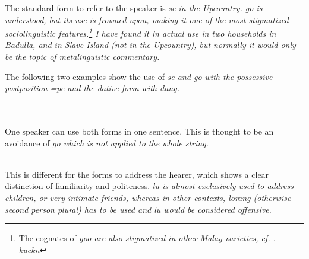 
The standard form to refer to the speaker is \em se \em in the Upcountry. \em go \em is understood, but its use is frowned upon, making it one of the most stigmatized sociolinguistic features.\footnote{The cognates of \em goo \em are also stigmatized in other Malay varieties, cf. \citep{Ansaldo2009}. kuckn} I have found it in actual use in two households in Badulla, and in Slave Island (not in the Upcountry), but normally it would only be the topic of metalinguistic commentary.

The following two examples show the use of \em se \em and \em go \em with the possessive postposition \em =pe \em and the dative form with \em dang\em.

 \\
 \\
One speaker can use both forms in one sentence. This is thought to be an avoidance of \em go \em which is not applied to the whole string.

 \\
This is different for the forms to address the hearer, which shows a clear distinction of familiarity and politeness. \em lu \em is almost exclusively used to address children, or very intimate friends, whereas in other contexts, \em lorang \em (otherwise second person plural) has to be used and \em lu \em would be considered offensive.

